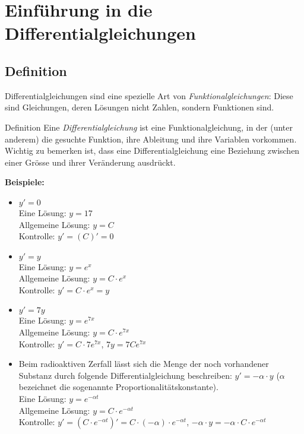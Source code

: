 \section{Einführung in die Differentialgleichungen}\label{sec:einfuhrung-in-die-differentialgleichungen}

\subsection{Definition}\label{subsec:definition}

Differentialgleichungen sind eine spezielle Art von \emph{Funktionalgleichungen}: Diese sind Gleichungen, deren Lösungen nicht Zahlen, sondern Funktionen sind.

\begin{definition}{Definition}
    Eine \emph{Differentialgleichung} ist eine Funktionalgleichung, in der (unter anderem) die gesuchte Funktion, ihre Ableitung und ihre Variablen vorkommen.
    Wichtig zu bemerken ist, dass eine Differentialgleichung eine Beziehung zwischen einer Grösse und ihrer Veränderung ausdrückt.
\end{definition}

\textbf{Beispiele:}
\begin{itemize}
    \item $y' = 0$ \\ Eine Lösung: $y = 17$ \\ Allgemeine Lösung: $y = C$ \\ Kontrolle: $y' = (C)' = 0$
    \item $y' = y$ \\ Eine Lösung: $y = e^x$ \\ Allgemeine Lösung: $y = C \cdot e^x$ \\ Kontrolle: $y' = C \cdot e^x = y$
    \item $y' = 7y$ \\ Eine Lösung: $y = e^{7x}$ \\ Allgemeine Lösung: $y = C \cdot e^{7x}$ \\ Kontrolle: $y' = C \cdot 7e^{7x}$, $7y = 7Ce^{7x}$
    \item Beim radioaktiven Zerfall lässt sich die Menge der noch vorhandener Substanz durch folgende Differentialgleichung beschreiben: $y' = -\alpha \cdot y$ ($\alpha$ bezeichnet die sogenannte Proportionalitätskonstante). \\ Eine Lösung: $y = e^{-\alpha t}$ \\ Allgemeine Lösung: $y = C \cdot e^{-\alpha t}$ \\ Kontrolle: $y' = (C \cdot e^{-\alpha t})' = C \cdot (-\alpha) \cdot e^{-\alpha t}$, $-\alpha \cdot y = -\alpha \cdot C \cdot e^{-\alpha t}$
\end{itemize}

